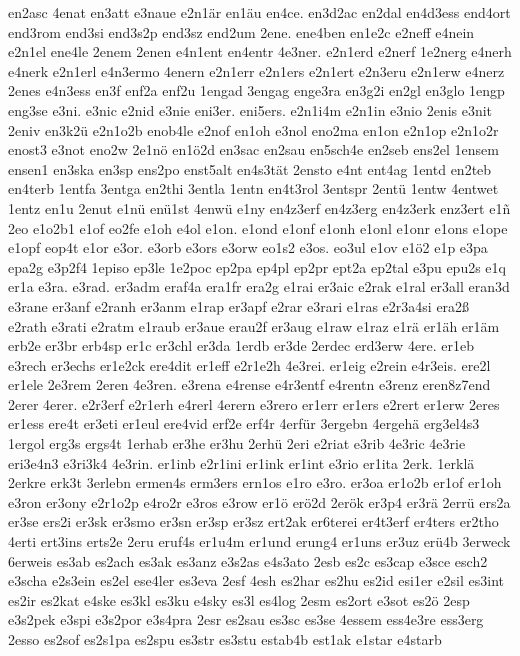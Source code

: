 {en2asc
4enat
en3att
e3naue
e2n1är
en1äu
en4ce.
en3d2ac
en2dal
en4d3ess
end4ort
end3rom
end3si
end3s2p
end3sz
end2um
2ene.
ene4ben
en1e2c
e2neff
e4nein
e2n1el
ene4le
2enem
2enen
e4n1ent
en4entr
4e3ner.
e2n1erd
e2nerf
1e2nerg
e4nerh
e4nerk
e2n1erl
e4n3ermo
4enern
e2n1err
e2n1ers
e2n1ert
e2n3eru
e2n1erw
e4nerz
2enes
e4n3ess
en3f
enf2a
enf2u
1engad
3engag
enge3ra
en3g2i
en2gl
en3glo
1engp
eng3se
e3ni.
e3nic
e2nid
e3nie
eni3er.
eni5ers.
e2n1i4m
e2n1in
e3nio
2enis
e3nit
2eniv
en3k2ü
e2n1o2b
enob4le
e2nof
en1oh
e3nol
eno2ma
en1on
e2n1op
e2n1o2r
enost3
e3not
eno2w
2e1nö
en1ö2d
en3sac
en2sau
en5sch4e
en2seb
ens2el
1ensem
ensen1
en3ska
en3sp
ens2po
enst5alt
en4s3tät
2ensto
e4nt
ent4ag
1entd
en2teb
en4terb
1entfa
3entga
en2thi
3entla
1entn
en4t3rol
3entspr
2entü
1entw
4entwet
1entz
en1u
2enut
e1nü
enü1st
4enwü
e1ny
en4z3erf
en4z3erg
en4z3erk
enz3ert
e1ñ
2eo
e1o2b1
e1of
eo2fe
e1oh
e4ol
e1on.
e1ond
e1onf
e1onh
e1onl
e1onr
e1ons
e1ope
e1opf
eop4t
e1or
e3or.
e3orb
e3ors
e3orw
eo1s2
e3os.
eo3ul
e1ov
e1ö2
e1p
e3pa
epa2g
e3p2f4
1episo
ep3le
1e2poc
ep2pa
ep4pl
ep2pr
ept2a
ep2tal
e3pu
epu2s
e1q
er1a
e3ra.
e3rad.
er3adm
eraf4a
era1fr
era2g
e1rai
er3aic
e2rak
e1ral
er3all
eran3d
e3rane
er3anf
e2ranh
er3anm
e1rap
er3apf
e2rar
e3rari
e1ras
e2r3a4si
era2ß
e2rath
e3rati
e2ratm
e1raub
er3aue
erau2f
er3aug
e1raw
e1raz
e1rä
er1äh
er1äm
erb2e
er3br
erb4sp
er1c
er3chl
er3da
1erdb
er3de
2erdec
erd3erw
4ere.
er1eb
e3rech
er3echs
er1e2ck
ere4dit
er1eff
e2r1e2h
4e3rei.
er1eig
e2rein
e4r3eis.
ere2l
er1ele
2e3rem
2eren
4e3ren.
e3rena
e4rense
e4r3entf
e4rentn
e3renz
eren8z7end
2erer
4erer.
e2r3erf
e2r1erh
e4rerl
4erern
e3rero
er1err
er1ers
e2rert
er1erw
2eres
er1ess
ere4t
er3eti
er1eul
ere4vid
erf2e
erf4r
4erfür
3ergebn
4ergehä
erg3el4s3
1ergol
erg3s
ergs4t
1erhab
er3he
er3hu
2erhü
2eri
e2riat
e3rib
4e3ric
4e3rie
eri3e4n3
e3ri3k4
4e3rin.
er1inb
e2r1ini
er1ink
er1int
e3rio
er1ita
2erk.
1erklä
2erkre
erk3t
3erlebn
ermen4s
erm3ers
ern1os
e1ro
e3ro.
er3oa
er1o2b
er1of
er1oh
e3ron
er3ony
e2r1o2p
e4ro2r
e3ros
e3row
er1ö
erö2d
2erök
er3p4
er3rä
2errü
ers2a
er3se
ers2i
er3sk
er3smo
er3sn
er3sp
er3sz
ert2ak
er6terei
er4t3erf
er4ters
er2tho
4erti
ert3ins
erts2e
2eru
eruf4s
er1u4m
er1und
erung4
er1uns
er3uz
erü4b
3erweck
6erweis
es3ab
es2ach
es3ak
es3anz
e3s2as
e4s3ato
2esb
es2c
es3cap
e3sce
esch2
e3scha
e2s3ein
es2el
ese4ler
es3eva
2esf
4esh
es2har
es2hu
es2id
esi1er
e2sil
es3int
es2ir
es2kat
e4ske
es3kl
es3ku
e4sky
es3l
es4log
2esm
es2ort
e3sot
es2ö
2esp
e3s2pek
e3spi
e3s2por
e3s4pra
2esr
es2sau
es3sc
es3se
4essem
ess4e3re
ess3erg
2esso
es2sof
es2s1pa
es2spu
es3str
es3stu
estab4b
est1ak
e1star
e4starb
}
